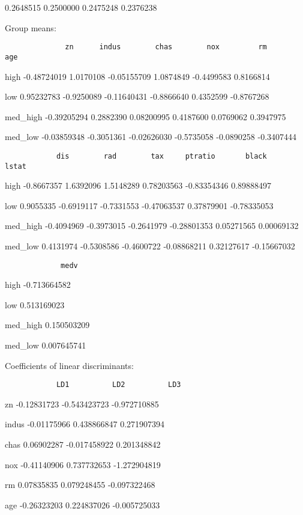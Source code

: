 \documentclass[]{article}
\begin{document}
0.2648515 0.2500000 0.2475248 0.2376238

Group means:

\begin{verbatim}
              zn      indus        chas        nox         rm        age 
\end{verbatim}

high -0.48724019 1.0170108 -0.05155709 1.0874849 -0.4499583 0.8166814

low 0.95232783 -0.9250089 -0.11640431 -0.8866640 0.4352599 -0.8767268

med\_high -0.39205294 0.2882390 0.08200995 0.4187600 0.0769062 0.3947975

med\_low -0.03859348 -0.3051361 -0.02626030 -0.5735058 -0.0890258
-0.3407444

\begin{verbatim}
            dis        rad        tax     ptratio       black       lstat 
\end{verbatim}

high -0.8667357 1.6392096 1.5148289 0.78203563 -0.83354346 0.89888497

low 0.9055335 -0.6919117 -0.7331553 -0.47063537 0.37879901 -0.78335053

med\_high -0.4094969 -0.3973015 -0.2641979 -0.28801353 0.05271565
0.00069132

med\_low 0.4131974 -0.5308586 -0.4600722 -0.08868211 0.32127617
-0.15667032

\begin{verbatim}
             medv 
\end{verbatim}

high -0.713664582

low 0.513169023

med\_high 0.150503209

med\_low 0.007645741

Coefficients of linear discriminants:

\begin{verbatim}
            LD1          LD2          LD3 
\end{verbatim}

zn -0.12831723 -0.543423723 -0.972710885

indus -0.01175966 0.438866847 0.271907394

chas 0.06902287 -0.017458922 0.201348842

nox -0.41140906 0.737732653 -1.272904819

rm 0.07835835 0.079248455 -0.097322468

age -0.26323203 0.224837026 -0.005725033
\end{document}
